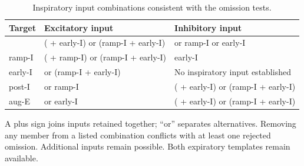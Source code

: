 \begin{table}[htbp]
\centering\small
\caption{Inspiratory input combinations consistent with the omission tests.}
\label{tab:inspiratory_alternatives}
\begin{tabular}{@{}p{.12\linewidth}p{.41\linewidth}p{.41\linewidth}@{}}
\toprule
Target & Excitatory input & Inhibitory input \\
\midrule
\preII{} & (\preII{} + early-I) or (ramp-I + early-I) & \preII{} or ramp-I or early-I \\[5pt]
ramp-I & (\preII{} + ramp-I) or (ramp-I + early-I) & early-I \\[5pt]
early-I & \preII{} or (ramp-I + early-I) & No inspiratory input established \\[5pt]
post-I & \preII{} or ramp-I & (\preII{} + early-I) or (ramp-I + early-I) \\[5pt]
aug-E & \preII{} or early-I & (\preII{} + early-I) or (ramp-I + early-I) \\[5pt]
\bottomrule
\end{tabular}
\par\smallskip\begin{minipage}{\linewidth}\footnotesize A plus sign joins inputs retained together; ``or'' separates alternatives. Removing any member from a listed combination conflicts with at least one rejected omission. Additional inputs remain possible. Both expiratory templates remain available.\end{minipage}
\end{table}
